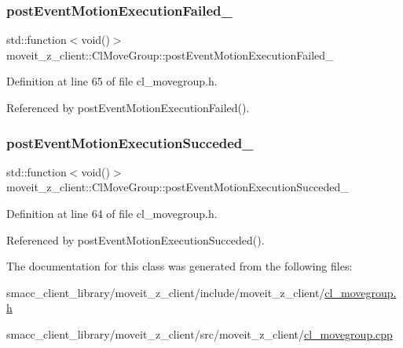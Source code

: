 \subsubsection{\texorpdfstring{post\+Event\+Motion\+Execution\+Failed\+\_\+}{postEventMotionExecutionFailed\_}}
{\footnotesize\ttfamily std\+::function$<$void()$>$ moveit\+\_\+z\+\_\+client\+::\+Cl\+Move\+Group\+::post\+Event\+Motion\+Execution\+Failed\+\_\+\hspace{0.3cm}{\ttfamily [private]}}



Definition at line 65 of file cl\+\_\+movegroup.\+h.



Referenced by post\+Event\+Motion\+Execution\+Failed().

\mbox{\label{classmoveit__z__client_1_1ClMoveGroup_a9234c0edadb1f173c31fc8fa5430afcd}} 
\subsubsection{\texorpdfstring{post\+Event\+Motion\+Execution\+Succeded\+\_\+}{postEventMotionExecutionSucceded\_}}
{\footnotesize\ttfamily std\+::function$<$void()$>$ moveit\+\_\+z\+\_\+client\+::\+Cl\+Move\+Group\+::post\+Event\+Motion\+Execution\+Succeded\+\_\+\hspace{0.3cm}{\ttfamily [private]}}



Definition at line 64 of file cl\+\_\+movegroup.\+h.



Referenced by post\+Event\+Motion\+Execution\+Succeded().



The documentation for this class was generated from the following files\+:\begin{DoxyCompactItemize}
\item 
smacc\+\_\+client\+\_\+library/moveit\+\_\+z\+\_\+client/include/moveit\+\_\+z\+\_\+client/\hyperlink{cl__movegroup_8h}{cl\+\_\+movegroup.\+h}\item 
smacc\+\_\+client\+\_\+library/moveit\+\_\+z\+\_\+client/src/moveit\+\_\+z\+\_\+client/\hyperlink{cl__movegroup_8cpp}{cl\+\_\+movegroup.\+cpp}\end{DoxyCompactItemize}
